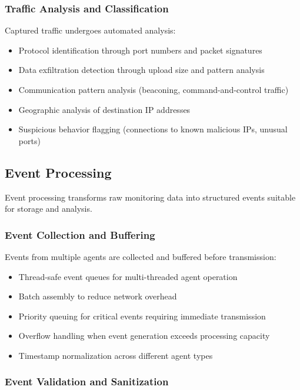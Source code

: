 \subsubsection{Traffic Analysis and Classification}

Captured traffic undergoes automated analysis:

\begin{itemize}
    \item Protocol identification through port numbers and packet signatures
    \item Data exfiltration detection through upload size and pattern analysis
    \item Communication pattern analysis (beaconing, command-and-control traffic)
    \item Geographic analysis of destination IP addresses
    \item Suspicious behavior flagging (connections to known malicious IPs, unusual ports)
\end{itemize}

\subsection{Event Processing}

Event processing transforms raw monitoring data into structured events suitable for storage and analysis.

\subsubsection{Event Collection and Buffering}

Events from multiple agents are collected and buffered before transmission:

\begin{itemize}
    \item Thread-safe event queues for multi-threaded agent operation
    \item Batch assembly to reduce network overhead
    \item Priority queuing for critical events requiring immediate transmission
    \item Overflow handling when event generation exceeds processing capacity
    \item Timestamp normalization across different agent types
\end{itemize}

\subsubsection{Event Validation and Sanitization}


